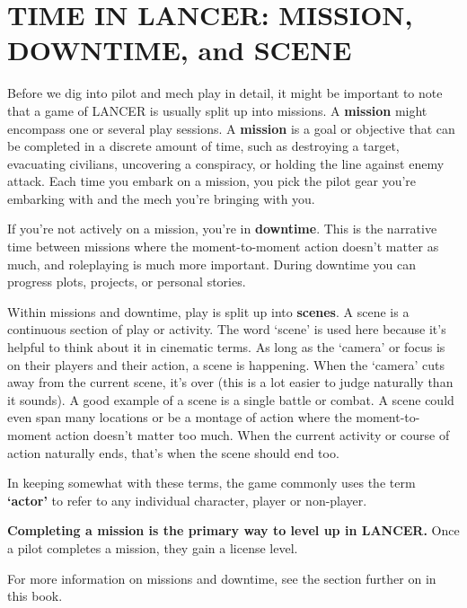 \section{TIME IN LANCER: MISSION, DOWNTIME, and SCENE}

Before we dig into pilot and mech play in detail, it might be important to note that a game of
LANCER is usually split up into missions. A \textbf{mission} might encompass one or several play
sessions. A \textbf{mission} is a goal or objective that can be completed in a discrete amount of time,
such as destroying a target, evacuating civilians, uncovering a conspiracy, or holding the line
against enemy attack. Each time you embark on a mission, you pick the pilot gear you’re
embarking with and the mech you’re bringing with you.

If you’re not actively on a mission, you’re in \textbf{downtime}. This is the narrative time between
missions where the moment-to-moment action doesn’t matter as much, and roleplaying is much
more important. During downtime you can progress plots, projects, or personal stories.

Within missions and downtime, play is split up into \textbf{scenes}. A scene is a continuous section of
play or activity. The word ‘scene’ is used here because it’s helpful to think about it in cinematic
terms. As long as the ‘camera’ or focus is on their players and their action, a scene is happening.
When the ‘camera’ cuts away from the current scene, it’s over (this is a lot easier to judge
naturally than it sounds). A good example of a scene is a single battle or combat. A scene could
even span many locations or be a montage of action where the moment-to-moment action
doesn’t matter too much. When the current activity or course of action naturally ends, that’s
when the scene should end too.

In keeping somewhat with these terms, the game commonly uses the term \textbf{‘actor’} to refer to any
individual character, player or non-player.

\textbf{Completing a mission is the primary way to level up in LANCER.} Once a pilot completes a
mission, they gain a license level.

For more information on missions and downtime, see the section further on in this book.